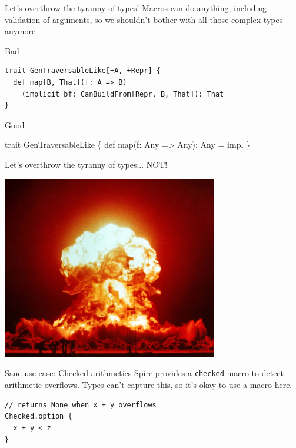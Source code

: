 \documentclass{beamer}
\begin{document}
\begin{frame}[fragile]{Let's overthrow the tyranny of types!}
  Macros can do anything, including validation of arguments,
  so we shouldn't bother with all those complex types anymore

  \vspace{1em}
  \begin{alertblock}{Bad}
  \begin{verbatim}
trait GenTraversableLike[+A, +Repr] {
  def map[B, That](f: A => B)
    (implicit bf: CanBuildFrom[Repr, B, That]): That
}\end{verbatim}
  \end{alertblock}

  \begin{exampleblock}{Good}
  \begin{semiverbatim}
trait GenTraversableLike \{
  def map(f: Any => Any): Any = \text{\color{blue}{macro}} impl
\}
  \end{semiverbatim}
  \end{exampleblock}
\end{frame}

\begin{frame}[fragile]{Let's overthrow the tyranny of types... NOT!}
  \begin{center}
    \includegraphics[height=8cm]{img/boom.jpg}
  \end{center}
\end{frame}

\begin{frame}[fragile]{Sane use case: Checked arithmetics}
  Spire provides a \texttt{checked} macro to detect arithmetic overflows.
  Types can't capture this, so it's okay to use a macro here.

  \vspace{1em}
  \begin{verbatim}
// returns None when x + y overflows
Checked.option {
  x + y < z
}
  \end{verbatim}
\end{frame}
\end{document}
